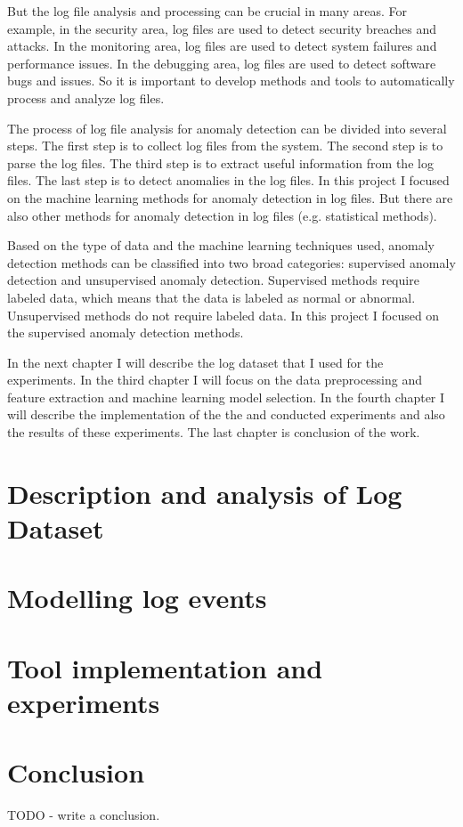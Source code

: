 But the log file analysis and processing can be crucial in many areas. For example, in the security area, log files are used to detect security breaches and attacks. 
In the monitoring area, log files are used to detect system failures and performance issues. In the debugging area, log files are used to detect software bugs and issues. %
So it is important to develop methods and tools to automatically process and analyze log files. 

The process of log file analysis for anomaly detection can be divided into several steps. The first step is to collect log files from the system. The second step is to parse the log files.
The third step is to extract useful information from the log files. The last step is to detect anomalies in the log files. In this project I focused on the machine learning methods for anomaly detection in log files.
But there are also other methods for anomaly detection in log files (e.g. statistical methods). %

Based on the type of data and the machine learning techniques used, anomaly detection methods can be classified into two broad categories: supervised anomaly detection and unsupervised
anomaly detection. Supervised methods require labeled data, which means that the data is labeled as normal or abnormal. Unsupervised methods do not require labeled data. In this project I focused on 
the supervised anomaly detection methods.

In the next chapter I will describe the log dataset that I used for the experiments. In the third chapter I will focus on the data preprocessing and feature extraction and machine learning model selection.
In the fourth chapter I will describe the implementation of the the and conducted experiments and also the results of these experiments. The last chapter is conclusion of the work.
\chapter{Description and analysis of Log Dataset}

\chapter{Modelling log events}

\chapter{Tool implementation and experiments}

\chapter{Conclusion}

TODO - write a conclusion.


% 